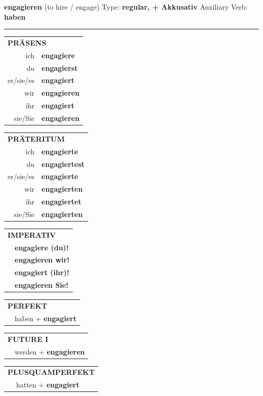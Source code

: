 \documentclass[10pt,a4paper]{revtex4-2}
\begin{document}
\begin{verbbox-acc}
{\Large \bf engagieren} (to hire / engage) \hfill Type: \textbf{regular, + Akkusativ} \hfill Auxiliary Verb: \textbf{haben}

\vspace{5pt}
\hrule
\vspace{5pt}

\begin{tabular}{rl}
\multicolumn{2}{l}{\textbf{PRÄSENS}}\\
ich & \textbf{engagiere}\\
du & \textbf{engagierst}\\
er/sie/es & \textbf{engagiert}\\
wir & \textbf{engagieren}\\
ihr & \textbf{engagiert}\\
sie/Sie & \textbf{engagieren}\\
\end{tabular}
\hfill
\begin{tabular}{rl}
\multicolumn{2}{l}{\textbf{PRÄTERITUM}}\\
ich & \textbf{engagierte}\\
du & \textbf{engagiertest}\\
er/sie/es & \textbf{engagierte}\\
wir & \textbf{engagierten}\\
ihr & \textbf{engagiertet}\\
sie/Sie & \textbf{engagierten}\\
\end{tabular}
\hfill
\begin{tabular}{rl}
\multicolumn{2}{l}{\textbf{IMPERATIV}}\\
& \textbf{engagiere (du)!}\\
& \textbf{engagieren wir!}\\
& \textbf{engagiert (ihr)!}\\
& \textbf{engagieren Sie!}\\
\end{tabular}

\vspace{10pt}

\begin{tabular}{rl}
\multicolumn{2}{l}{\textbf{PERFEKT}}\\
& haben + \textbf{engagiert}\\
\end{tabular}
\hfill
\begin{tabular}{rl}
\multicolumn{2}{l}{\textbf{FUTURE I}}\\
& werden + \textbf{engagieren}\\
\end{tabular}
\hfill
\begin{tabular}{rl}
\multicolumn{2}{l}{\textbf{PLUSQUAMPERFEKT}}\\
& hatten + \textbf{engagiert}\\
\end{tabular}


\end{verbbox-acc}
\end{document}
